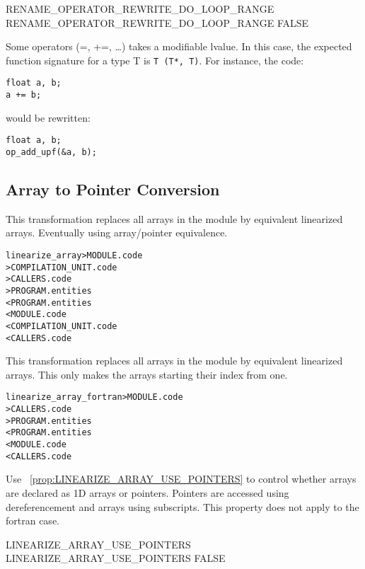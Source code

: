 \documentclass[a4paper]{report}
\newenvironment{PipsMake}{\begin{alltt}}{\end{alltt}}
\newcommand{\PipsPropRef}[1]{\texttt{\detokenize{#1}}~\ref{prop:#1}}
\newenvironment{PipsPass}[1]{\label{pass:#1}}{}
\begin{document}
\begin{PipsProp}{RENAME_OPERATOR_REWRITE_DO_LOOP_RANGE}
RENAME_OPERATOR_REWRITE_DO_LOOP_RANGE FALSE
\end{PipsProp}

Some operators (=, +=, \ldots) takes a modifiable lvalue. In this case, the expected function signature for a type T is \lstinline$T (T*, T)$.
For instance, the code:
\begin{lstlisting}
float a, b;
a += b;
\end{lstlisting}
would be rewritten:
\begin{lstlisting}
float a, b;
op_add_upf(&a, b);
\end{lstlisting}

\subsection{Array to Pointer Conversion}


\begin{PipsPass}{linearize_array}
This transformation replaces all arrays in the module by equivalent linearized
arrays.
Eventually using array/pointer equivalence.
\end{PipsPass}

\begin{PipsMake}
linearize_array > MODULE.code
                 > COMPILATION_UNIT.code
				 > CALLERS.code
		         > PROGRAM.entities
		< PROGRAM.entities
		< MODULE.code
        < COMPILATION_UNIT.code
		< CALLERS.code
\end{PipsMake}

\begin{PipsPass}{linearize_array_fortran}
This transformation replaces all arrays in the module by equivalent linearized
arrays. This only makes the arrays starting their index from one.
\end{PipsPass}

\begin{PipsMake}
linearize_array_fortran > MODULE.code
                        > CALLERS.code
		        > PROGRAM.entities
		        < PROGRAM.entities
		        < MODULE.code
		        < CALLERS.code
\end{PipsMake}

Use \PipsPropRef{LINEARIZE_ARRAY_USE_POINTERS} to control whether arrays are
declared as 1D arrays or pointers. Pointers are accessed using dereferencement
and arrays using subscripts. This property does not apply to the fortran case.
\begin{PipsProp}{LINEARIZE_ARRAY_USE_POINTERS}
LINEARIZE_ARRAY_USE_POINTERS FALSE
\end{PipsProp}
\end{document}
